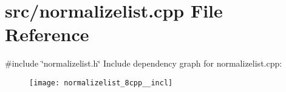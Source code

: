 \section{src/normalizelist.cpp File Reference}
\label{normalizelist_8cpp}
{\ttfamily \#include \char`\"{}normalizelist.\+h\char`\"{}}\newline
Include dependency graph for normalizelist.\+cpp\+:\nopagebreak
\begin{figure}[H]
\begin{center}
\leavevmode
\texttt{[image: normalizelist\_8cpp\_\_incl]}
\end{center}
\end{figure}
